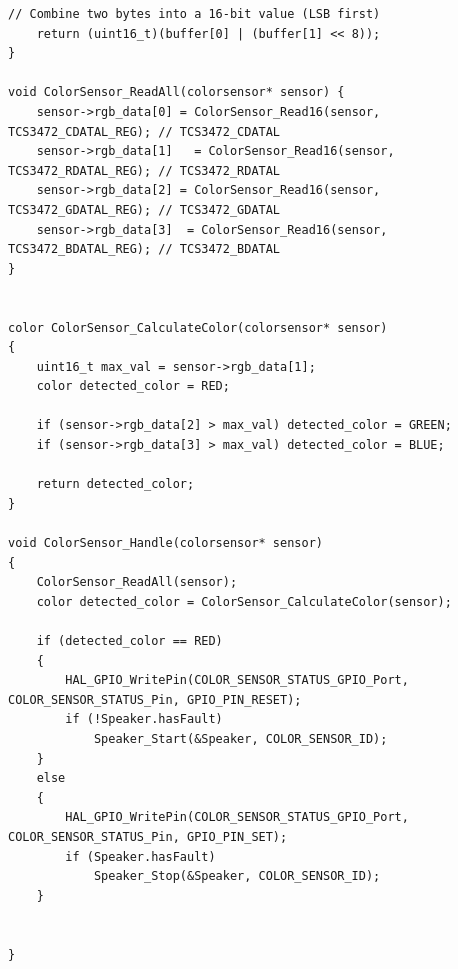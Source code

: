 \documentclass{article}
\begin{document}
\begin{lstlisting}[caption={STM32 TCS34725 Firmware Implementation}, label={lst:stm32_colorsensor_code}]
    // Combine two bytes into a 16-bit value (LSB first)
    return (uint16_t)(buffer[0] | (buffer[1] << 8));
}

void ColorSensor_ReadAll(colorsensor* sensor) {
    sensor->rgb_data[0] = ColorSensor_Read16(sensor, TCS3472_CDATAL_REG); // TCS3472_CDATAL
    sensor->rgb_data[1]   = ColorSensor_Read16(sensor, TCS3472_RDATAL_REG); // TCS3472_RDATAL
    sensor->rgb_data[2] = ColorSensor_Read16(sensor, TCS3472_GDATAL_REG); // TCS3472_GDATAL
    sensor->rgb_data[3]  = ColorSensor_Read16(sensor, TCS3472_BDATAL_REG); // TCS3472_BDATAL
}


color ColorSensor_CalculateColor(colorsensor* sensor)
{
	uint16_t max_val = sensor->rgb_data[1];
	color detected_color = RED;

	if (sensor->rgb_data[2] > max_val) detected_color = GREEN;
	if (sensor->rgb_data[3] > max_val) detected_color = BLUE;

	return detected_color;
}

void ColorSensor_Handle(colorsensor* sensor)
{
	ColorSensor_ReadAll(sensor);
	color detected_color = ColorSensor_CalculateColor(sensor);

	if (detected_color == RED)
	{
		HAL_GPIO_WritePin(COLOR_SENSOR_STATUS_GPIO_Port, COLOR_SENSOR_STATUS_Pin, GPIO_PIN_RESET);
		if (!Speaker.hasFault)
			Speaker_Start(&Speaker, COLOR_SENSOR_ID);
	}
	else
	{
		HAL_GPIO_WritePin(COLOR_SENSOR_STATUS_GPIO_Port, COLOR_SENSOR_STATUS_Pin, GPIO_PIN_SET);
		if (Speaker.hasFault)
			Speaker_Stop(&Speaker, COLOR_SENSOR_ID);
	}


}
\end{lstlisting}
\end{document}
